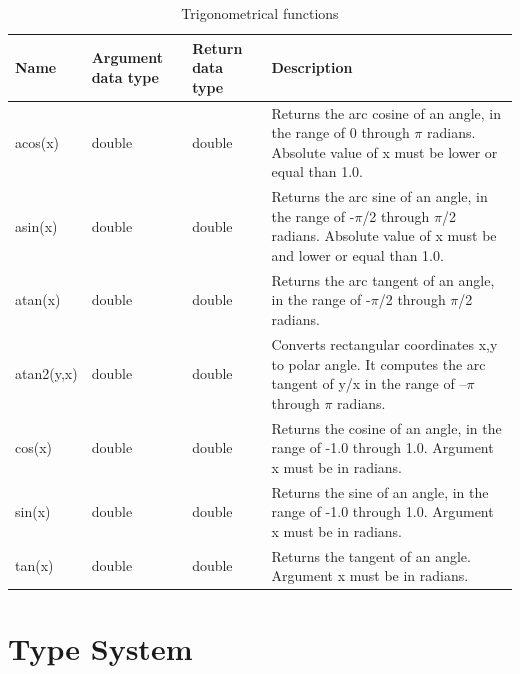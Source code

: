 \documentclass[11pt,a4paper]{ivoa}
\begin{document}
\begin{table}[thm]\footnotesize
    \begin{tabular}{|p{}|p{}|p{}|p{}|}
        \hline

        \hline
        \textbf{Name} &
        \textbf{Argument \newline data type} &
        \textbf{Return \newline data type} &
        \textbf{Description}
        \tabularnewline

        \hline
        acos(x) &
        double &
        double &
        Returns the arc cosine of an angle, in the range of 0 through \(\pi\) radians. Absolute value of x must be lower or equal than 1.0.
        \tabularnewline

        \hline
        asin(x) &
        double &
        double &
        Returns the arc sine of an angle, in the range of -\(\pi\)/2 through \(\pi\)/2 radians. Absolute value of x must be and lower or equal than 1.0.
        \tabularnewline

        \hline
        atan(x) &
        double &
        double &
        Returns the arc tangent of an angle, in the range of -\(\pi\)/2 through \(\pi\)/2 radians.
        \tabularnewline
        
        \hline
        atan2(y,x) &
        double &
        double &
        Converts rectangular coordinates x,y to polar angle. It computes the arc tangent of y/x in the range of –\(\pi\) through \(\pi\) radians.
        \tabularnewline

        \hline
        cos(x) &
        double &
        double &
        Returns the cosine of an angle, in the range of -1.0 through 1.0. Argument x must be in radians.
        \tabularnewline

        \hline
        sin(x) &
        double &
        double &
        Returns the sine of an angle, in the range of -1.0 through 1.0. Argument x must be in radians.
        \tabularnewline

        \hline
        tan(x) &
        double &
        double &
        Returns the tangent of an angle. Argument x must be in radians.
        \tabularnewline

        \hline
    \end{tabular}
    \caption{Trigonometrical functions}
    \label{table:trig.functions}
\end{table}

\clearpage
\section{Type System}
\label{sec:types}
\end{document}
